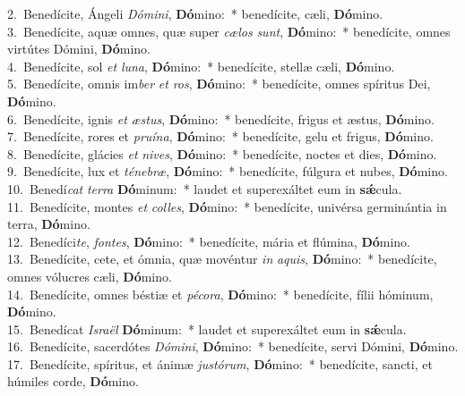 {2.~}Benedícite, Ángeli \textit{Dó}\textit{mi}\textit{ni}, \textbf{Dó}mino:~* benedícite, cæli, \textbf{Dó}mino.\\
{3.~}Benedícite, aquæ omnes, quæ super \textit{cæ}\textit{los} \textit{sunt}, \textbf{Dó}mino:~* benedícite, omnes virtútes Dómini, \textbf{Dó}mino.\\
{4.~}Benedícite, sol \textit{et} \textit{lu}\textit{na}, \textbf{Dó}mino:~* benedícite, stellæ cæli, \textbf{Dó}mino.\\
{5.~}Benedícite, omnis im\textit{ber} \textit{et} \textit{ros}, \textbf{Dó}mino:~* benedícite, omnes spíritus Dei, \textbf{Dó}mino.\\
{6.~}Benedícite, ignis \textit{et} \textit{æ}\textit{stus}, \textbf{Dó}mino:~* benedícite, frigus et æstus, \textbf{Dó}mino.\\
{7.~}Benedícite, rores et \textit{pru}\textit{í}\textit{na}, \textbf{Dó}mino:~* benedícite, gelu et frigus, \textbf{Dó}mino.\\
{8.~}Benedícite, glácies \textit{et} \textit{ni}\textit{ves}, \textbf{Dó}mino:~* benedícite, noctes et dies, \textbf{Dó}mino.\\
{9.~}Benedícite, lux et \textit{té}\textit{ne}\textit{bræ}, \textbf{Dó}mino:~* benedícite, fúlgura et nubes, \textbf{Dó}mino.\\
{10.~}Benedí\textit{cat} \textit{ter}\textit{ra} \textbf{Dó}minum:~* laudet et superexáltet eum in \textbf{sǽ}cula.\\
{11.~}Benedícite, montes \textit{et} \textit{col}\textit{les}, \textbf{Dó}mino:~* benedícite, univérsa germinántia in terra, \textbf{Dó}mino.\\
{12.~}Benedíci\textit{te}, \textit{fon}\textit{tes}, \textbf{Dó}mino:~* benedícite, mária et flúmina, \textbf{Dó}mino.\\
{13.~}Benedícite, cete, et ómnia, quæ movéntur \textit{in} \textit{a}\textit{quis}, \textbf{Dó}mino:~* benedícite, omnes vólucres cæli, \textbf{Dó}mino.\\
{14.~}Benedícite, omnes béstiæ et \textit{pé}\textit{co}\textit{ra}, \textbf{Dó}mino:~* benedícite, fílii hóminum, \textbf{Dó}mino.\\
{15.~}Benedícat \textit{Is}\textit{ra}\textit{ël} \textbf{Dó}minum:~* laudet et superexáltet eum in \textbf{sǽ}cula.\\
{16.~}Benedícite, sacerdótes \textit{Dó}\textit{mi}\textit{ni}, \textbf{Dó}mino:~* benedícite, servi Dómini, \textbf{Dó}mino.\\
{17.~}Benedícite, spíritus, et ánimæ \textit{ju}\textit{stó}\textit{rum}, \textbf{Dó}mino:~* benedícite, sancti, et húmiles corde, \textbf{Dó}mino.\\
